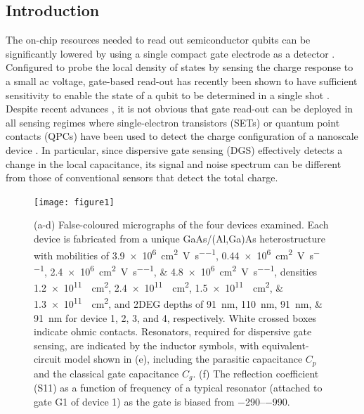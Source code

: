 \subsection{Introduction}

The on-chip resources needed to read out semiconductor qubits can be significantly lowered by using a single compact gate electrode as a detector \cite{PhysRevLett.110.046805}. Configured to probe the local density of states by sensing the charge response to a small ac voltage, gate-based read-out has recently been shown to have sufficient sensitivity to enable the state of a qubit to be determined in a single shot \cite{Nnano_dzurak}. Despite recent advances \cite{fernando1,PhysRevApplied.10.014018,PhysRevX.8.041032}, it is not obvious that gate read-out can be deployed in all sensing regimes where single-electron transistors (SETs) or quantum point contacts (QPCs) have been used to detect the charge configuration of a nanoscale device \cite{Reilly:2007ig,Devoret_schoel}. In particular, since dispersive gate sensing (DGS) effectively detects a change in the local capacitance, its signal and noise spectrum can be different from those of conventional sensors that detect the total charge.

\begin{figure}
\texttt{[image: figure1]}
\caption[Devices used to examine the anomalous dispersive readout signal]{\label{fig:pock_fig1} (a-d) False-coloured micrographs of the four devices examined. Each device is fabricated from a unique GaAs/(Al,Ga)As heterostructure with mobilities of \SIlist[list-units=single]{3.9e6;0.44e6;2.4e6;4.8e6}{\square\centi\meter\per\volt\per\second}, densities \SIlist[list-units = single]{1.2e11;2.4e11;1.5e11;1.3e11}{\per\square\centi\meter}, and 2DEG depths of \SIlist{91;110;91;91}{\nano\meter} for device 1, 2, 3, and 4, respectively. White crossed boxes indicate ohmic contacts. Resonators, required for dispersive gate sensing, are indicated by the inductor symbols, with equivalent-circuit model shown in (e), including the parasitic capacitance $C_p$ and the classical gate capacitance $C_g$. (f) The reflection coefficient (S11) as a function of frequency of a typical resonator (attached to gate G1 of device 1) as the gate is biased from \SIrange{-290}{-990}{\mv}.}
\end{figure}

